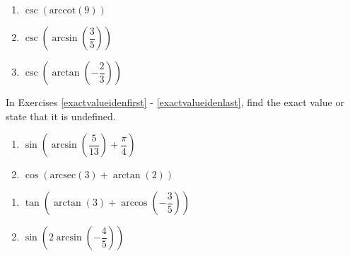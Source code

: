 \documentclass{ximera}
\begin{document}
\begin{multicols}{3}

\begin{enumerate}

\setcounter{enumi}{\value{HW}}

\item  $\csc\left(\text{arccot}\left(9 \right)\right)$ 
\item  $\csc\left(\arcsin\left(\dfrac{3}{5}\right)\right)$
\item  $\csc\left(\arctan\left(-\dfrac{2}{3}\right)\right)$ \label{stillmoreexactlast}

\setcounter{HW}{\value{enumi}}

\end{enumerate}

\end{multicols}

In Exercises \ref{exactvalueidenfirst} - \ref{exactvalueidenlast}, find the exact value or state that it is undefined.

\begin{multicols}{2}

\begin{enumerate}

\setcounter{enumi}{\value{HW}}

\item  $\sin\left(\arcsin\left( \dfrac{5}{13} \right) + \dfrac{\pi}{4}\right)$ \label{exactvalueidenfirst}
\item  $\cos\left( \text{arcsec}(3) + \arctan(2) \right)$ 

\setcounter{HW}{\value{enumi}}

\end{enumerate}

\end{multicols}

\begin{multicols}{2}

\begin{enumerate}

\setcounter{enumi}{\value{HW}}

\item  $\tan\left( \arctan(3) + \arccos\left(-\dfrac{3}{5}\right) \right)$
\item  $\sin\left(2\arcsin\left(-\dfrac{4}{5}\right)\right)$

\setcounter{HW}{\value{enumi}}

\end{enumerate}

\end{multicols}
\end{document}

